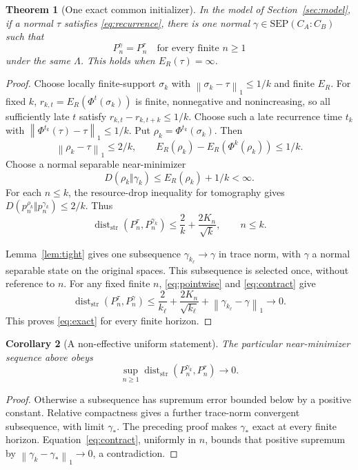 \documentclass[11pt,a4paper]{article}
\numberwithin{equation}{section}
\newtheorem{theorem}{Theorem}[section]
\newtheorem{corollary}[theorem]{Corollary}
\theoremstyle{remark}
\newcommand{\SEP}{\mathrm{SEP}}
\newcommand{\ER}{E_R}
\newcommand{\dd}{\operatorname{dist}_{\mathrm{str}}}
\newcommand{\normone}[1]{\left\|#1\right\|_1}
\begin{document}
\begin{theorem}[One exact common initializer]\label{thm:exact}
In the model of Section~\ref{sec:model}, if a normal \(\tau\) satisfies
\eqref{eq:recurrence}, there is one normal
\(\gamma\in\SEP(C_A:C_B)\) such that
\begin{equation}
 P_n^\gamma=P_n^\tau\quad\text{for every finite }n\geq1              \label{eq:exact}
\end{equation}
under the same \(\Lambda\). This holds when \(\ER(\tau)=\infty\).
\end{theorem}
\begin{proof}
Choose locally finite-support \(\sigma_k\) with
\(\normone{\sigma_k-\tau}\leq1/k\) and finite \(\ER\).
For fixed \(k\), \(r_{k,t}=\ER(\Phi^t(\sigma_k))\) is finite,
nonnegative and nonincreasing, so all sufficiently late \(t\) satisfy
\(r_{k,t}-r_{k,t+k}\leq1/k\). Choose such a late recurrence time \(t_k\)
with \(\normone{\Phi^{t_k}(\tau)-\tau}\leq1/k\).
Put \(\rho_k=\Phi^{t_k}(\sigma_k)\). Then
\[
 \normone{\rho_k-\tau}\leq2/k,\qquad
 \ER(\rho_k)-\ER(\Phi^k(\rho_k))\leq1/k.
\]
Choose a normal separable near-minimizer
\[
 D(\rho_k\Vert\gamma_k)\leq\ER(\rho_k)+1/k<\infty.
\]
For each \(n\leq k\), the resource-drop inequality for tomography gives
\(D(p_n^{\rho_k}\Vert p_n^{\gamma_k})\leq2/k\). Thus
\begin{equation}
 \dd(P_n^\tau,P_n^{\gamma_k})\leq
       \frac2k+\frac{2K_n}{\sqrt k},\qquad n\leq k.                 \label{eq:pointwise}
\end{equation}

Lemma~\ref{lem:tight} gives one subsequence
\(\gamma_{k_\ell}\to\gamma\) in trace norm, with \(\gamma\) a normal
separable state on the original spaces. This subsequence is selected once,
without reference to \(n\). For any fixed finite \(n\),
\eqref{eq:pointwise} and \eqref{eq:contract} give
\[
 \dd(P_n^\tau,P_n^\gamma)
 \leq \frac2{k_\ell}+\frac{2K_n}{\sqrt{k_\ell}}
       +\normone{\gamma_{k_\ell}-\gamma}\longrightarrow0.
\]
This proves \eqref{eq:exact} for every finite horizon.
\end{proof}

\begin{corollary}[A non-effective uniform statement]\label{cor:uniform}
The particular near-minimizer sequence above obeys
\[
 \sup_{n\geq1}\dd(P_n^{\gamma_k},P_n^\tau)\longrightarrow0.
\]
\end{corollary}
\begin{proof}
Otherwise a subsequence has supremum error bounded below by a positive
constant. Relative compactness gives a further trace-norm convergent
subsequence, with limit \(\gamma_*\). The preceding proof makes
\(\gamma_*\) exact at every finite horizon. Equation~\eqref{eq:contract},
uniformly in \(n\), bounds that positive supremum by
\(\normone{\gamma_k-\gamma_*}\to0\), a contradiction.
\end{proof}
\end{document}
